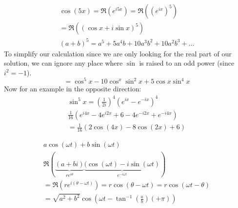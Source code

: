 \documentclass[00_complete]{subfiles}
\begin{document}
\begin{example}
\[
\begin{gathered}
    \cos(5x) = \Re(e^{i5x}) = \Re((e^{ix})^5) \\
    = \Re((\cos x+i\sin x)^5) \\
    (a+b)^5 = a^5 + 5a^4b+10a^3b^2 + 10a^2b^3 + \ldots
\end{gathered}
\]
To simplify our calculation since we are only looking for the real part
of our solution, we can ignore any place where \(\sin\) is raised to an
odd power (since \(i^2 = -1\)). \[
    = \cos^5x-10\cos^x\sin^2x+5\cos x\sin^4x
\] Now for an example in the opposite direction: \[
\begin{gathered}
    \sin^5x = \left(\frac{1}{2i}\right)^4(e^{ix}-e^{-ix})^4 \\
    \frac{1}{16}(e^{i4x}-4e^{i2x} +6 -4 e^{-i2x}+e^{-i4x}) \\
    =\frac{1}{16}(2\cos (4x)-8 \cos (2x)+6)
\end{gathered}
\]
\end{example}
\begin{example}
\[
\begin{gathered}
    a \cos (\omega t) + b\sin(\omega t) \\
    \Re(\underbrace{(a+bi)}_{re^{i \theta}}\underbrace{(\cos(\omega t)- i \sin
    (\omega t)}_{e^{-i\omega t}}) \\
    = \Re\left(re^{i(\theta - \omega t)}\right) = r \cos(\theta - \omega t) = r \cos(\omega t - \theta)\\
    =\sqrt{a^2 + b^2} \cos\left(\omega t -\tan^{-1}\left(\frac{a}{b}\right)(+
    \pi)\right) 
\end{gathered}
\]
\end{example}
\end{document}
